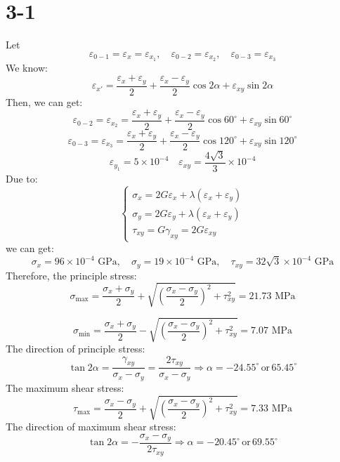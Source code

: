 \documentclass[onecolumn,oneside]{SUSTechHomework}
\begin{document}
  \section*{3-1}
  Let \[
  \varepsilon_{0-1} = \varepsilon_x = \varepsilon_{x_1} , \quad \varepsilon_{0-2} = \varepsilon_{x_2}, \quad \varepsilon_{0-3} = \varepsilon_{x_3}
  \]
  We know:
  \[
  \varepsilon_{x'} = \frac{\varepsilon_x + \varepsilon_y}{2} + \frac{\varepsilon_x - \varepsilon_y}{2} \cos 2\alpha + \varepsilon_{xy} \sin 2\alpha
  \]
  Then, we can get:
  \[
    \varepsilon_{0-2} = \varepsilon_{x_2} = \frac{\varepsilon_x + \varepsilon_y}{2} + \frac{\varepsilon_x - \varepsilon_y}{2} \cos 60^\circ + \varepsilon_{xy} \sin 60^\circ
  \]
  \[
    \varepsilon_{0-3} = \varepsilon_{x_3} = \frac{\varepsilon_x + \varepsilon_y}{2} + \frac{\varepsilon_x - \varepsilon_y}{2} \cos 120^\circ + \varepsilon_{xy} \sin 120^\circ
  \]
  \[
  \varepsilon_{y_1} = 5\times 10^{-4} \quad \varepsilon_{xy} = \frac{4\sqrt{3}}{3}\times 10^{-4}
  \]
  Due to:
  \[
    \begin{cases}
    \sigma_x = 2G \varepsilon_x + \lambda (\varepsilon_x + \varepsilon_y)\\
    \sigma_y = 2G \varepsilon_y + \lambda (\varepsilon_x + \varepsilon_y)\\
    \tau_{xy} = G \gamma_{xy} = 2G\varepsilon_{xy}
    \end{cases}
  \]
  we can get:
  \[
    \sigma_x = 96 \times 10^{-4} \text{ GPa}, \quad \sigma_y = 19 \times 10^{-4} \text{ GPa}, \quad \tau_{xy} = 32\sqrt{3} \times 10^{-4} \text{ GPa}
  \]
  Therefore, the principle stress:
  \[
  \sigma_{\text{max}} = \frac{\sigma_x + \sigma_y}{2} + \sqrt{\left( \frac{\sigma_x - \sigma_y}{2} \right)^2 + \tau_{xy}^2} = 21.73 \text{ MPa}
  \]

  \[
  \sigma_{\text{min}} = \frac{\sigma_x + \sigma_y}{2} - \sqrt{\left( \frac{\sigma_x - \sigma_y}{2} \right)^2 + \tau_{xy}^2} = 7.07 \text{ MPa}
  \]
  The direction of principle stress:
  \[
  \tan 2\alpha = \frac{\gamma_{xy}}{\sigma_x - \sigma_y} = \frac{2\tau_{xy}}{\sigma_x - \sigma_y} \Rightarrow \alpha = -24.55^\circ\, \text{or}\, 65.45^\circ 
  \]
  The maximum shear stress:
  \[
    \tau_{\text{max}} = \frac{\sigma_x - \sigma_y}{2} + \sqrt{\left( \frac{\sigma_x - \sigma_y}{2} \right)^2 + \tau_{xy}^2} = 7.33 \text{ MPa}
  \]
  The direction of maximum shear stress:
  \[
  \tan 2\alpha = -\frac{\sigma_x - \sigma_y}{2 \tau_{xy}} \Rightarrow \alpha = -20.45^\circ \, \text{or}\, 69.55^\circ 
  \]
\end{document}

